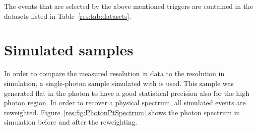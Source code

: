 The events that are selected by the above mentioned triggers are contained in the datasets listed in Table~\ref{res:tab:datasets}.
\renewcommand{\arraystretch}{1.5}
\begin{table}[!hbt]
\centering
\caption{Single-photon data samples used for the resolution measurement with the contained integrated luminosity.}
\label{res:tab:datasets}
\end{table}  

\section{Simulated samples}
\label{res:sec:SimulatedSamples}

In order to compare the measured resolution in data to the resolution in simulation, a single-photon sample simulated with \pythiaSix is used.
This sample was generated flat in the photon \pt to have a good statistical precision also for the high photon \pt region.
In order to recover a physical \pt spectrum, all simulated events are reweighted.
Figure~\ref{res:fig:PhotonPtSpectrum} shows the photon \pt spectrum in simulation before and after the reweighting. 

